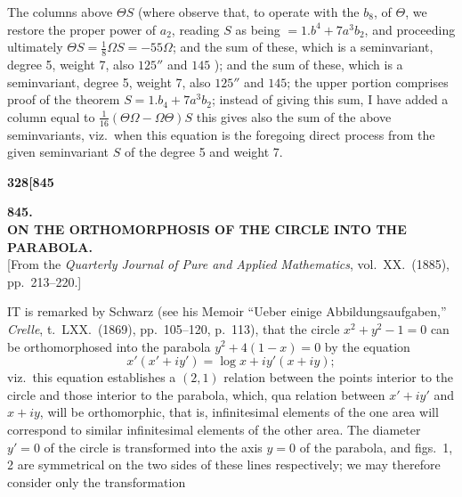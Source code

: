 \documentclass[12pt,a4paper]{article}
\theoremstyle{definition}
\begin{document}
The columns above $\Theta S$ (where observe that, to operate with the $b_8$, of $\Theta$, we restore the proper power of $a_2$, reading $S$ as being $= 1.b^4 + 7a^3b_2$, and proceeding ultimately $\Theta S = \frac{1}{8}\Omega S = -55\Omega$; and the sum of these, which is a seminvariant, degree 5, weight 7, also $125''$ and $145$ ); and the sum of these, which is a seminvariant, degree 5, weight 7, also $125''$ and $145$; the upper portion comprises proof of the theorem $S = 1.b_4 + 7a^3b_2$; instead of giving this sum, I have added a column equal to $\frac{1}{16}(\Theta\Omega - \Omega\Theta)S$ this gives also the sum of the above seminvariants, viz.\ when this equation is the foregoing direct process from the given seminvariant $S$ of the degree 5 and weight 7.

\vspace{2em}


\newpage
\setcounter{page}{328}

\noindent\textbf{328}\hfill\textbf{[845}

\bigskip

\begin{center}
{\Large\textbf{845.}}\\[1em]
{\large\textbf{ON THE ORTHOMORPHOSIS OF THE CIRCLE INTO THE PARABOLA.}}\\[1em]
[From the \textit{Quarterly Journal of Pure and Applied Mathematics}, vol.\ XX.\ (1885), pp.\ 213--220.]
\end{center}

\bigskip

\noindent IT is remarked by Schwarz (see his Memoir ``Ueber einige Abbildungsaufgaben,'' \textit{Crelle}, t.\ LXX.\ (1869), pp.\ 105--120, p.\ 113), that the circle $x^2 + y^2 - 1 = 0$ can be orthomorphosed into the parabola $y^2 + 4(1 - x) = 0$ by the equation
\[
x'(x' + iy') = \log x + iy'(x + iy);
\]
viz.\ this equation establishes a $(2, 1)$ relation between the points interior to the circle and those interior to the parabola, which, qua relation between $x' + iy'$ and $x + iy$, will be orthomorphic, that is, infinitesimal elements of the one area will correspond to similar infinitesimal elements of the other area. The diameter $y' = 0$ of the circle is transformed into the axis $y = 0$ of the parabola, and figs.\ 1, 2 are symmetrical on the two sides of these lines respectively; we may therefore consider only the transformation
\end{document}
